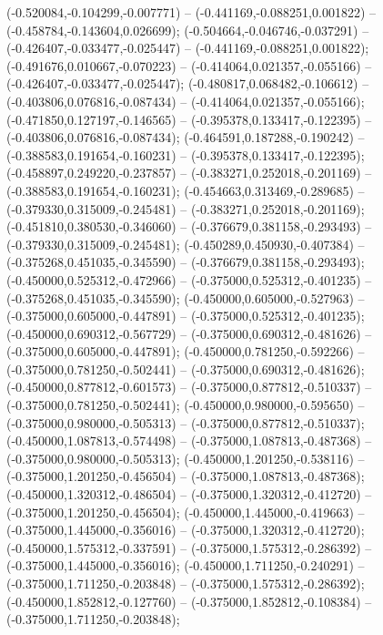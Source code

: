  (-0.520084,-0.104299,-0.007771) -- (-0.441169,-0.088251,0.001822) -- (-0.458784,-0.143604,0.026699);
 (-0.504664,-0.046746,-0.037291) -- (-0.426407,-0.033477,-0.025447) -- (-0.441169,-0.088251,0.001822);
 (-0.491676,0.010667,-0.070223) -- (-0.414064,0.021357,-0.055166) -- (-0.426407,-0.033477,-0.025447);
 (-0.480817,0.068482,-0.106612) -- (-0.403806,0.076816,-0.087434) -- (-0.414064,0.021357,-0.055166);
 (-0.471850,0.127197,-0.146565) -- (-0.395378,0.133417,-0.122395) -- (-0.403806,0.076816,-0.087434);
 (-0.464591,0.187288,-0.190242) -- (-0.388583,0.191654,-0.160231) -- (-0.395378,0.133417,-0.122395);
 (-0.458897,0.249220,-0.237857) -- (-0.383271,0.252018,-0.201169) -- (-0.388583,0.191654,-0.160231);
 (-0.454663,0.313469,-0.289685) -- (-0.379330,0.315009,-0.245481) -- (-0.383271,0.252018,-0.201169);
 (-0.451810,0.380530,-0.346060) -- (-0.376679,0.381158,-0.293493) -- (-0.379330,0.315009,-0.245481);
 (-0.450289,0.450930,-0.407384) -- (-0.375268,0.451035,-0.345590) -- (-0.376679,0.381158,-0.293493);
 (-0.450000,0.525312,-0.472966) -- (-0.375000,0.525312,-0.401235) -- (-0.375268,0.451035,-0.345590);
 (-0.450000,0.605000,-0.527963) -- (-0.375000,0.605000,-0.447891) -- (-0.375000,0.525312,-0.401235);
 (-0.450000,0.690312,-0.567729) -- (-0.375000,0.690312,-0.481626) -- (-0.375000,0.605000,-0.447891);
 (-0.450000,0.781250,-0.592266) -- (-0.375000,0.781250,-0.502441) -- (-0.375000,0.690312,-0.481626);
 (-0.450000,0.877812,-0.601573) -- (-0.375000,0.877812,-0.510337) -- (-0.375000,0.781250,-0.502441);
 (-0.450000,0.980000,-0.595650) -- (-0.375000,0.980000,-0.505313) -- (-0.375000,0.877812,-0.510337);
 (-0.450000,1.087813,-0.574498) -- (-0.375000,1.087813,-0.487368) -- (-0.375000,0.980000,-0.505313);
 (-0.450000,1.201250,-0.538116) -- (-0.375000,1.201250,-0.456504) -- (-0.375000,1.087813,-0.487368);
 (-0.450000,1.320312,-0.486504) -- (-0.375000,1.320312,-0.412720) -- (-0.375000,1.201250,-0.456504);
 (-0.450000,1.445000,-0.419663) -- (-0.375000,1.445000,-0.356016) -- (-0.375000,1.320312,-0.412720);
 (-0.450000,1.575312,-0.337591) -- (-0.375000,1.575312,-0.286392) -- (-0.375000,1.445000,-0.356016);
 (-0.450000,1.711250,-0.240291) -- (-0.375000,1.711250,-0.203848) -- (-0.375000,1.575312,-0.286392);
 (-0.450000,1.852812,-0.127760) -- (-0.375000,1.852812,-0.108384) -- (-0.375000,1.711250,-0.203848);
